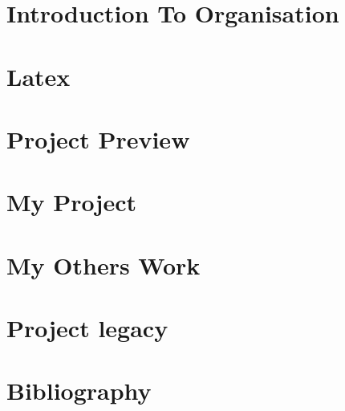 \documentclass[12pt]{article}
\begin{document}
\begin{screen}
\ppttitle
\end{screen}

\thispagestyle{empty} 
\pagetitle
\newpage
{}
\cfoot{\thepage}


\newpage

\newpage



\newpage
\tableofcontents
\newpage
\listoffigures
\newpage


\cfoot{\thepage}


\newpage
\section{Introduction To Organisation}

\newpage
\section{Latex}

\newpage
\section{Project Preview}

\newpage
\section{My Project}

\newpage
\section{My Others Work}

\newpage
\section{Project legacy}

\newpage
\section{Bibliography}

\begin{screen}
\newpage

\end{screen}
\end{document}
